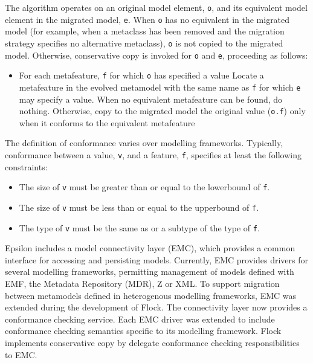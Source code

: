 The algorithm operates on an original model element, \texttt{o}, and its equivalent model element in the migrated model, \texttt{e}. When \texttt{o} has no equivalent in the migrated model (for example, when a metaclass has been removed and the migration strategy specifies no alternative metaclass), \texttt{o} is not copied to the migrated model. Otherwise, conservative copy is invoked for \texttt{o} and \texttt{e}, proceeding as follows:

\begin{itemize}
	\item For each metafeature, \texttt{f} for which \texttt{o} has specified a value
		\subitem Locate a metafeature in the evolved metamodel with the same name as \texttt{f} for which \texttt{e} may specify a value.
			\subsubitem When no equivalent metafeature can be found, do nothing.
			\subsubitem Otherwise, copy to the migrated model the original value (\texttt{o.f}) only when it conforms to the equivalent metafeature
\end{itemize}

The definition of conformance varies over modelling frameworks. Typically, conformance between a value, \texttt{v}, and a feature, \texttt{f}, specifies at least the following constraints:

\begin{itemize}
	\item The size of \texttt{v} must be greater than or equal to the lowerbound of \texttt{f}.
	\item The size of \texttt{v} must be less than or equal to the upperbound of \texttt{f}.
	\item The type of \texttt{v} must be the same as or a subtype of the type of \texttt{f}.
\end{itemize}


Epsilon includes a model connectivity layer (EMC), which provides a common interface for accessing and persisting models. Currently, EMC provides drivers for several modelling frameworks, permitting management of models defined with EMF, the Metadata Repository (MDR), Z or XML. To support migration between metamodels defined in heterogenous modelling frameworks, EMC was extended during the development of Flock. The connectivity layer now provides a conformance checking service. Each EMC driver was extended to include conformance checking semantics specific to its modelling framework. Flock implements conservative copy by delegate conformance checking responsibilities to EMC. 

